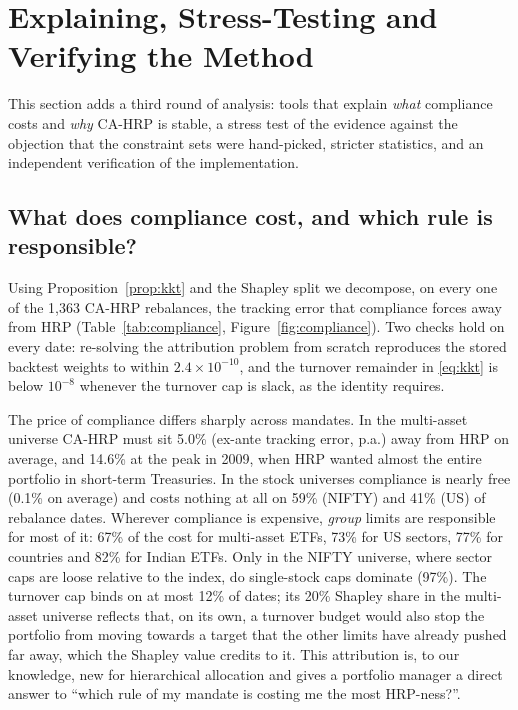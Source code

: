 \section{Explaining, Stress-Testing and Verifying the Method}\label{sec:round3}

This section adds a third round of analysis: tools that explain \emph{what} compliance costs
and \emph{why} CA-HRP is stable, a stress test of the evidence against the objection that the
constraint sets were hand-picked, stricter statistics, and an independent verification of the
implementation.

\subsection{What does compliance cost, and which rule is responsible?}
Using Proposition~\ref{prop:kkt} and the Shapley split we decompose, on every one of the
1{,}363 CA-HRP rebalances, the tracking error that compliance forces away from HRP
(Table~\ref{tab:compliance}, Figure~\ref{fig:compliance}). Two checks hold on every date:
re-solving the attribution problem from scratch reproduces the stored backtest weights to
within $2.4\times10^{-10}$, and the turnover remainder in \eqref{eq:kkt} is below
$10^{-8}$ whenever the turnover cap is slack, as the identity requires.

The price of compliance differs sharply across mandates. In the multi-asset universe CA-HRP
must sit 5.0\% (ex-ante tracking error, p.a.) away from HRP on average, and 14.6\% at the peak
in 2009, when HRP wanted almost the entire portfolio in short-term Treasuries. In the stock
universes compliance is nearly free (0.1\% on average) and costs nothing at all on 59\%
(NIFTY) and 41\% (US) of rebalance dates. Wherever compliance is expensive, \emph{group}
limits are responsible for most of it: 67\% of the cost for multi-asset ETFs, 73\% for US
sectors, 77\% for countries and 82\% for Indian ETFs. Only in the NIFTY universe, where sector
caps are loose relative to the index, do single-stock caps dominate (97\%). The turnover cap
binds on at most 12\% of dates; its 20\% Shapley share in the multi-asset universe reflects
that, on its own, a turnover budget would also stop the portfolio from moving towards a target
that the other limits have already pushed far away, which the Shapley value credits to it.
This attribution is, to our knowledge, new for hierarchical allocation and gives a portfolio
manager a direct answer to ``which rule of my mandate is costing me the most HRP-ness?''.

